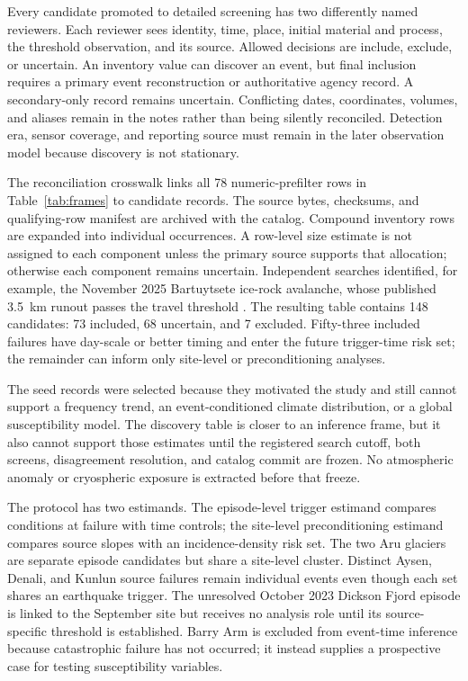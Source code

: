 \documentclass[11pt]{article}
\begin{document}
Every candidate promoted to detailed screening has two differently named
reviewers. Each reviewer sees identity, time, place, initial material and
process, the threshold observation, and its source. Allowed decisions are
include, exclude, or uncertain. An inventory value can discover an event, but
final inclusion requires a primary event reconstruction or authoritative
agency record. A secondary-only record remains uncertain. Conflicting dates,
coordinates, volumes, and aliases remain in the notes rather than being
silently reconciled. Detection era, sensor coverage, and reporting source
must remain in the later observation model because discovery is not stationary.

The reconciliation crosswalk links all 78 numeric-prefilter rows in
Table~\ref{tab:frames} to candidate records. The source bytes, checksums, and
qualifying-row manifest are archived with the catalog. Compound inventory rows
are
expanded into individual occurrences. A row-level size estimate is not
assigned to each component unless the primary source supports that allocation;
otherwise each component remains uncertain. Independent searches identified,
for example, the November 2025 Bartuytsete ice-rock avalanche, whose published
3.5~km runout passes the travel threshold \citep{Dokukin2026}. The resulting
table contains 148 candidates: 73 included, 68 uncertain, and 7 excluded.
Fifty-three included failures have day-scale or better timing and enter the
future trigger-time risk set; the remainder can inform only site-level or
preconditioning analyses.

The seed records were selected because they motivated the study and still
cannot support a frequency trend, an event-conditioned climate distribution,
or a global susceptibility model. The discovery table is closer to an
inference frame, but it also cannot support those estimates until the
registered search cutoff, both screens, disagreement resolution, and catalog
commit are frozen. No atmospheric anomaly or cryospheric exposure is extracted
before that freeze.

The protocol has two estimands. The episode-level trigger estimand compares
conditions at failure with time controls; the site-level preconditioning
estimand compares source slopes with an incidence-density risk set. The two
Aru glaciers are separate episode candidates but share a site-level cluster.
Distinct Aysen, Denali, and Kunlun source failures remain individual events
even though each set shares an earthquake trigger. The unresolved October 2023
Dickson Fjord episode is linked to the September site but receives no analysis
role until its source-specific threshold is established. Barry Arm is excluded
from event-time inference because catastrophic failure has not occurred; it
instead supplies a prospective case for testing susceptibility variables.
\end{document}
